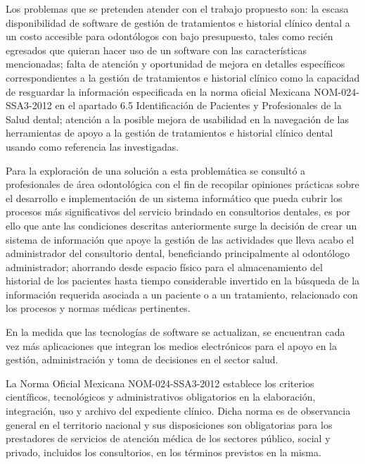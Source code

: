 \vspace{1em}

Los problemas que se pretenden atender con el trabajo propuesto son: la escasa disponibilidad de software de gestión de tratamientos e historial clínico dental a un costo accesible para odontólogos con bajo presupuesto, tales como recién egresados que quieran hacer uso de un software con las características mencionadas; falta de atención y oportunidad de mejora en detalles específicos correspondientes a la gestión de tratamientos e historial clínico como la capacidad de resguardar la información especificada en la norma oficial Mexicana NOM-024-SSA3-2012 en el apartado 6.5 Identificación de Pacientes y Profesionales de la Salud dental; atención a la posible mejora de usabilidad en la navegación de las herramientas de apoyo a la gestión de tratamientos e historial clínico dental usando como referencia las investigadas.

\vspace{1em}

Para la exploración de una solución a esta problemática se consultó a profesionales de área odontológica con el fin de recopilar opiniones prácticas sobre el desarrollo e implementación de un sistema informático que pueda cubrir los procesos más significativos del servicio brindado en consultorios dentales, es por ello que ante las condiciones descritas anteriormente surge la decisión de crear un sistema de información que apoye la gestión de las actividades que lleva acabo el administrador del consultorio dental, beneficiando principalmente al odontólogo administrador; ahorrando desde espacio físico para el almacenamiento del historial de los pacientes hasta tiempo considerable invertido en la búsqueda de la información requerida asociada a un paciente o a un tratamiento, relacionado con los procesos y normas médicas pertinentes.


\iffalse
En la medida que las tecnologías de software se actualizan, se encuentran cada vez más aplicaciones que integran los medios electrónicos para el apoyo en la gestión, administración y toma de decisiones en el sector salud.

\vspace{1em}

La Norma Oficial Mexicana NOM-024-SSA3-2012 establece los criterios científicos, tecnológicos y administrativos obligatorios en la elaboración, integración, uso y archivo del expediente clínico. Dicha norma es de observancia general en el territorio nacional y sus disposiciones son obligatorias para los prestadores de servicios de atención médica de los sectores público, social y privado, incluidos los consultorios, en los términos previstos en la misma. 

